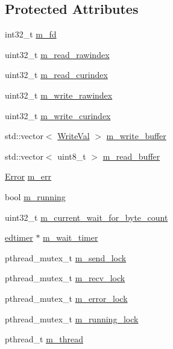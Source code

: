\subsection*{Protected Attributes}
\begin{DoxyCompactItemize}
\item 
int32\-\_\-t \hyperlink{classedthreaded__fd_aec9e15343d8764eae71949abfb72aae6}{m\-\_\-fd}
\item 
uint32\-\_\-t \hyperlink{classedthreaded__fd_a0b15523ca598761128ac79f7f4864d72}{m\-\_\-read\-\_\-rawindex}
\item 
uint32\-\_\-t \hyperlink{classedthreaded__fd_a4ada8ce6e55d793e5ac35fef6069cac2}{m\-\_\-read\-\_\-curindex}
\item 
uint32\-\_\-t \hyperlink{classedthreaded__fd_a5e31d54e745a41467270d2e8facef9f6}{m\-\_\-write\-\_\-rawindex}
\item 
uint32\-\_\-t \hyperlink{classedthreaded__fd_a318812ed9af58952dc87849634145e91}{m\-\_\-write\-\_\-curindex}
\item 
std\-::vector$<$ \hyperlink{structedthreaded__fd_1_1WriteVal}{Write\-Val} $>$ \hyperlink{classedthreaded__fd_aeaba4592ba02680a1d8653479f0d1d87}{m\-\_\-write\-\_\-buffer}
\item 
std\-::vector$<$ uint8\-\_\-t $>$ \hyperlink{classedthreaded__fd_ae1b93e783eee5006dd652cf75c117f28}{m\-\_\-read\-\_\-buffer}
\item 
\hyperlink{structedthreaded__fd_1_1Error}{Error} \hyperlink{classedthreaded__fd_a74eb86ee72a5dfa499e0529ac59955b0}{m\-\_\-err}
\item 
bool \hyperlink{classedthreaded__fd_a7ee685acbb7cb287455311b2dcd09bd4}{m\-\_\-running}
\item 
uint32\-\_\-t \hyperlink{classedthreaded__fd_a42482e8096aed090ead1f08f049a24e6}{m\-\_\-current\-\_\-wait\-\_\-for\-\_\-byte\-\_\-count}
\item 
\hyperlink{classedtimer}{edtimer} $\ast$ \hyperlink{classedthreaded__fd_ae1244377b4ee3faf7f4cb9e21afadba6}{m\-\_\-wait\-\_\-timer}
\item 
pthread\-\_\-mutex\-\_\-t \hyperlink{classedthreaded__fd_a8614fe087b0c94cc56be6b3cd71dbd66}{m\-\_\-send\-\_\-lock}
\item 
pthread\-\_\-mutex\-\_\-t \hyperlink{classedthreaded__fd_a9c2f74e0cd623edc946b6bd74de87e24}{m\-\_\-recv\-\_\-lock}
\item 
pthread\-\_\-mutex\-\_\-t \hyperlink{classedthreaded__fd_a407c7283668e38cefb828a3f4f4ec117}{m\-\_\-error\-\_\-lock}
\item 
pthread\-\_\-mutex\-\_\-t \hyperlink{classedthreaded__fd_a44b98e3c701b2b71b7abee958b05c1d8}{m\-\_\-running\-\_\-lock}
\item 
pthread\-\_\-t \hyperlink{classedthreaded__fd_a96c9e8af500d47320c1396cc270cc41e}{m\-\_\-thread}
\end{DoxyCompactItemize}
